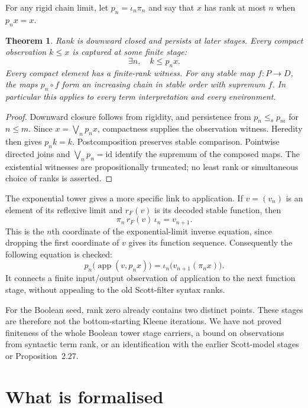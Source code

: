 \documentclass[11pt]{article}
\newtheorem{theorem}{Theorem}[section]
\newcommand{\id}{\mathrm{id}}
\begin{document}
For any rigid chain limit, let $p_n=\iota_n\pi_n$ and say that $x$ has
rank at most $n$ when $p_nx=x$.

\begin{theorem}
Rank is downward closed and persists at later stages. Every compact
observation $k\le x$ is captured at some finite stage:
\[
 \exists n,\quad k\le p_nx.
\]
Every compact element has a finite-rank witness. For any stable map
$f:P\to D$, the maps $p_n\circ f$ form an increasing chain in stable
order with supremum $f$. In particular this applies to every term
interpretation and every environment.
\end{theorem}
\begin{proof}
Downward closure follows from rigidity, and persistence from
$p_n\le_s p_m$ for $n\le m$. Since $x=\bigvee_n p_nx$, compactness
supplies the observation witness. Heredity then gives $p_nk=k$.
Postcomposition preserves stable comparison. Pointwise directed joins
and $\bigvee_n p_n=\id$ identify the supremum of the composed maps.
The existential witnesses are propositionally truncated; no least rank
or simultaneous choice of ranks is asserted.
\end{proof}

The exponential tower gives a more specific link to application. If
$v=(v_n)$ is an element of its reflexive limit and $r_F(v)$ is its decoded
stable function, then
\[
 \pi_n\,r_F(v)\,\iota_n=v_{n+1}.
\]
This is the $n$th coordinate of the exponential-limit inverse equation,
since dropping the first coordinate of $v$ gives its function sequence.
Consequently the following equation is checked:
\[
 p_n\bigl(\operatorname{app}(v,p_nx)\bigr)
   =\iota_n\bigl(v_{n+1}(\pi_nx)\bigr).
\]
It connects a finite input/output observation of application to the next
function stage, without appealing to the old Scott-filter syntax ranks.

For the Boolean seed, rank zero already contains two distinct points.
These stages are therefore not the bottom-starting Kleene iterations.
We have not proved finiteness of the whole Boolean tower stage carriers,
a bound on observations from syntactic term rank, or an identification
with the earlier Scott-model stages or Proposition~2.27.

\section{What is formalised}
\end{document}
